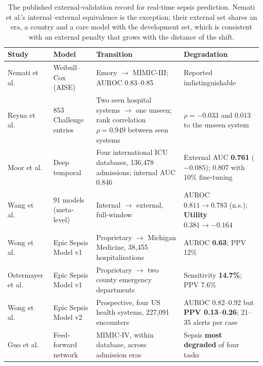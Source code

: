 \begin{table}[H]
    \centering\small
    \begin{tabularx}{\textwidth}{p{2.6cm}p{2.5cm}Xp{2.9cm}}
    \toprule
    \textbf{Study} & \textbf{Model} & \textbf{Transition} &
    \textbf{Degradation} \\
    \midrule
    Nemati et al.\ \cite{nemati2018aise} & Weibull--Cox (AISE) &
    Emory $\rightarrow$ MIMIC-III; AUROC 0.83--0.85 &
    Reported indistinguishable \\
    \addlinespace
    Reyna et al.\ \cite{reyna2020utility} & 853 Challenge entries &
    Two seen hospital systems $\rightarrow$ one unseen; rank correlation
    $\rho = 0.949$ between seen systems &
    $\rho = -0.033$ and $0.013$ to the unseen system \\
    \addlinespace
    Moor et al.\ \cite{moor2023review} & Deep temporal &
    Four international ICU databases, 136,478 admissions; internal AUC 0.846 &
    External AUC \textbf{0.761} ($-0.085$); 0.807 with 10\% fine-tuning \\
    \addlinespace
    Wang et al.\ \cite{wang2025srpm} & 91 models (meta-level) &
    Internal $\rightarrow$ external, full-window &
    AUROC $0.811 \rightarrow 0.783$ (n.s.); \textbf{Utility
    $0.381 \rightarrow -0.164$} \\
    \addlinespace
    Wong et al.\ \cite{wong2021epic} & Epic Sepsis Model v1 &
    Proprietary $\rightarrow$ Michigan Medicine, 38,455 hospitalisations &
    AUROC \textbf{0.63}; PPV 12\% \\
    \addlinespace
    Ostermayer et al.\ \cite{ostermayer2024external} & Epic Sepsis Model v1 &
    Proprietary $\rightarrow$ two county emergency departments &
    Sensitivity \textbf{14.7\%}; PPV 7.6\% \\
    \addlinespace
    Wong et al.\ \cite{wong2026epic} & Epic Sepsis Model v2 &
    Prospective, four US health systems, 227,091 encounters &
    AUROC 0.82--0.92 but \textbf{PPV 0.13--0.26}; 21--35 alerts per case \\
    \addlinespace
    Guo et al.\ \cite{guo2022temporal} & Feed-forward network &
    MIMIC-IV, within database, across admission eras &
    Sepsis \textbf{most degraded} of four tasks \\
    \bottomrule
    \end{tabularx}
    \caption{The published external-validation record for real-time sepsis
    prediction. Nemati et al.'s internal--external equivalence is the exception;
    their external set shares an era, a country and a care model with the
    development set, which is consistent with an external penalty that grows
    with the distance of the shift.}
    \label{tab:generalisation}
\end{table}

